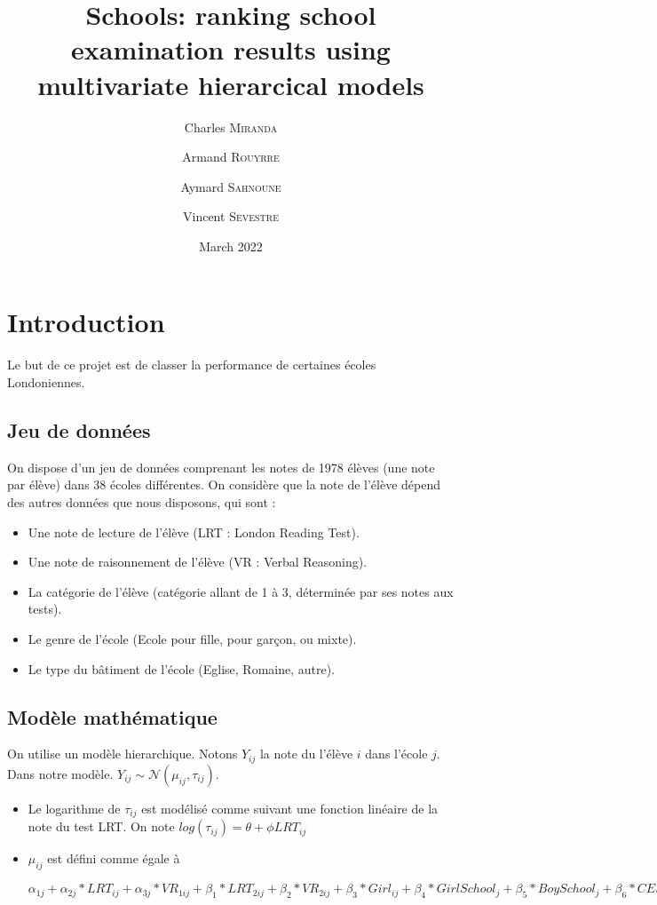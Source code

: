 \documentclass[11pt]{article}
\title{Schools: ranking school examination results using multivariate hierarcical models}
\author[1]{Charles \textsc{Miranda}}
\author[2]{Armand \textsc{Rouyrre}}
\author[3]{Aymard \textsc{Sahnoune}}
\author[4]{Vincent \textsc{Sevestre}}
\date{March 2022}
\begin{document}
    \maketitle

 \section{Introduction}
 Le but de ce projet est de classer la performance de certaines écoles Londoniennes.
 
  \subsection{Jeu de données}
    On dispose d'un jeu de données comprenant les notes de 1978 élèves (une note par élève) dans 38 écoles différentes. On considère que la note de l'élève dépend des autres données que nous disposons, qui sont : 
    \begin{itemize}
        \item Une note de lecture de l'élève (LRT : London Reading Test).
        \item Une note de raisonnement de l'élève (VR : Verbal Reasoning).
        \item La catégorie de l'élève (catégorie allant de 1 à 3, déterminée par ses notes aux tests).
                \item Le genre de l'école (Ecole pour fille, pour garçon, ou mixte).
        \item Le type du bâtiment de l'école (Eglise, Romaine, autre).
    \end{itemize}
    
    
  \subsection{Modèle mathématique}
    On utilise un modèle hierarchique. Notons $Y_{ij}$ la note du l'élève $i$ dans l'école $j$.
    Dans notre modèle. $Y_{ij} \sim \mathcal{N}( \mu_{ij}, \tau_{ij})$. 
    \begin{itemize}
        \item Le logarithme de $\tau_{ij}$ est modélisé comme suivant une fonction linéaire de la note du test LRT. On note $log (\tau_{ij}) = \theta + \phi LRT_{ij}$
        \item $\mu_{ij}$ est défini comme égale à 
        
        $\alpha_{1j} 
        + \alpha_{2j}* LRT_{ij} 
        + \alpha_{3j}* VR_{1ij} 
        + \beta_{1}* LRT_{2ij} 
        + \beta_{2}* VR_{2ij} 
        + \beta_{3}* Girl_{ij} 
        + \beta_{4}* GirlSchool_{j} 
        + \beta_{5}* BoySchool_{j} 
        + \beta_{6}* CESchool_{j} 
        + \beta_{7}* RCSchool_{j} 
        + \beta_{8}* OtherSchool_{j}$
    \end{itemize}
    
\end{document}
